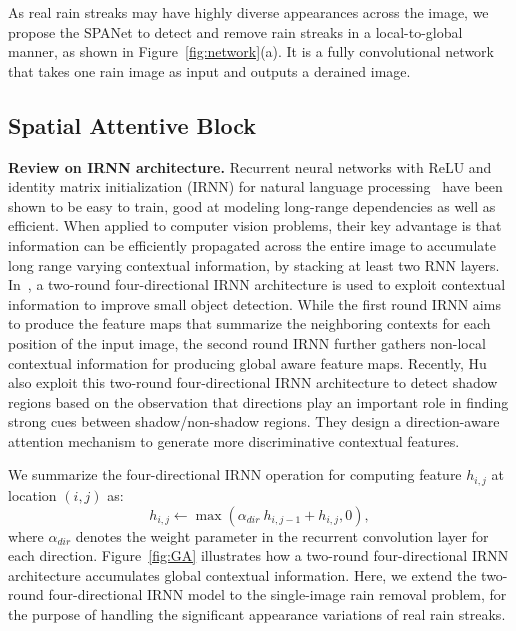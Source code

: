 \documentclass[10pt,twocolumn,letterpaper]{article}
\begin{document}
As real rain streaks may have highly diverse appearances across the image, we propose the SPANet to detect and remove rain streaks in a local-to-global manner, as shown in Figure~\ref{fig:network}(a). It is a fully convolutional network that takes one rain image as input and outputs a derained image.

\subsection{Spatial Attentive Block}

{\bf Review on IRNN architecture.} Recurrent neural networks with ReLU and identity matrix initialization (IRNN) for natural language processing~\cite{le:arxiv:2015:simple} have been shown to be easy to train, good at modeling long-range dependencies as well as efficient. When applied to computer vision problems, their key advantage is that information can be efficiently propagated across the entire image to accumulate long range varying contextual information, by stacking at least two RNN layers.
In~\cite{bell:cvpr:2016:ion}, a two-round four-directional IRNN architecture is used to exploit contextual information to improve small object detection. While the first round IRNN aims to produce the feature maps that summarize the neighboring contexts for each position of the input image, the second round IRNN further gathers non-local contextual information for producing global aware feature maps.
Recently, Hu~\etal~\cite{hu:cvpr:2018:dsc} also exploit this two-round four-directional IRNN architecture to detect shadow regions based on the observation that directions play an important role in finding strong cues between shadow/non-shadow regions. They design a direction-aware attention mechanism to generate more discriminative contextual features.

We summarize the four-directional IRNN operation for computing feature $h _ { i , j }$ at location $(i,j)$ as:
\begin{equation}\label{eq:trans}
  h _ { i , j }  \leftarrow \max \left( \alpha_{dir} \ h _ { i , j - 1 }  + h _ { i , j }  , 0 \right) ,
\end{equation}
where $\alpha_{dir}$ denotes the weight parameter in the recurrent convolution layer for each direction. Figure~\ref{fig:GA} illustrates how a two-round four-directional IRNN architecture accumulates global contextual information.
Here, we extend the two-round four-directional IRNN model to the single-image rain removal problem, for the purpose of handling the significant appearance variations of real rain streaks.
\end{document}
